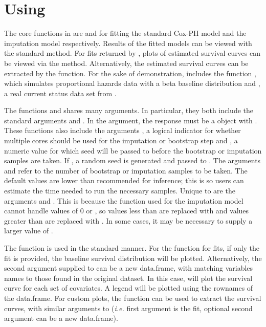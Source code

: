 \documentclass[article]{jss}
\begin{document}
{\section[use]{Using }	
	
	The core functions in  are  and  for fitting the standard Cox-PH model and the imputation model respectively. Results of the fitted models can be viewed with the standard  method. For fits returned by , plots of estimated survival curves can be viewed via the  method. Alternatively, the estimated survival curves can be extracted by the  function. For the sake of demonstration,  includes the function , which simulates proportional hazards data with a beta baseline distribution and , a real current status data set from \cite{mice_tumors}.
	
	The functions  and  shares many arguments. In particular, they both include the standard arguments  and . In the  argument, the response must be a  object with . These functions also include the arguments , a logical indicator for whether multiple cores should be used for the imputation or bootstrap step and , a numeric value for which seed will be passed to  before the bootstrap or imputation samples are taken. If , a random seed is generated and passed to . The arguments  and  refer to the number of bootstrap or imputation samples to be taken. The default values are lower than recommended for inference; this is so users can estimate the time needed to run the necessary samples. Unique to  are the arguments  and . This is because the  function  used for the imputation model cannot handle values of 0 or , so values less than  are replaced with  and values greater than  are replaced with . In some cases, it may be necessary to supply a larger value of . 
	
	The  function is used in the standard manner. For the  function for  fits, if only the fit is provided, the baseline survival distribution will be plotted. Alternatively, the second argument supplied to  can be a new data.frame, with matching variables names to those found in the original dataset. In this case,  will plot the survival curve for each set of covariates. A legend will be plotted using the rownames of the data.frame. For custom plots, the function  can be used to extract the survival curves, with similar arguments to  (\emph{i.e.} first argument is the fit, optional second argument can be a new data.frame). 
	
}
\end{document}
